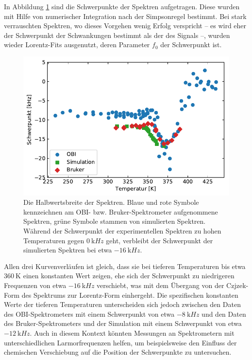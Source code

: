 \par\bigskip

In Abbildung \ref{fig:res:spek_mean} sind die Schwerpunkte der Spektren aufgetragen. Diese wurden mit Hilfe von numerischer Integration nach der Simpsonregel bestimmt. Bei stark verrauschten Spektren, wo dieses Vorgehen wenig Erfolg verspricht -- es wird eher der Schwerpunkt der Schwankungen bestimmt als der des Signals --, wurden wieder Lorentz-Fits ausgenutzt, deren Parameter $f_0$ der Schwerpunkt ist.
\begin{figure}
	\begin{center}
		\includegraphics[width=.9\textwidth]{graphics/plot/mean.pdf} 
	\end{center}
	\caption{Die Halbwertsbreite der Spektren. Blaue und rote Symbole kennzeichnen am OBI- bzw. Bruker-Spektrometer aufgenommene Spektren, grüne Symbole stammen von simulierten Spektren. Während der Schwerpunkt der experimentellen Spektren zu hohen Temperaturen gegen $\SI{0}{\kilo Hz}$ geht, verbleibt der Schwerpunkt der simulierten Spektren bei etwa $\SI{-16}{\kilo Hz}$.} \label{fig:res:spek_mean}
\end{figure}

Allen drei Kurvenverläufen ist gleich, dass sie bei tieferen Temperaturen bis etwa $\SI{360}{\kelvin}$ einen konstanten Wert zeigen, ehe sich der Schwerpunkt zu niedrigeren Frequenzen von etwa $\SI{-16}{\kilo Hz}$ verschiebt, was mit dem Übergang von der Czjzek-Form des Spektrums zur Lorentz-Form einhergeht. Die spezifischen konstanten Werte der tieferen Temperaturen unterscheiden sich jedoch zwischen den Daten des OBI-Spektrometers mit einem Schwerpunkt von etwa $\SI{-8}{\kilo Hz}$ und den Daten des Bruker-Spektrometers und der Simulation mit einem Schwerpunkt von etwa $\SI{-12}{\kilo Hz}$. Auch in diesem Kontext könnten Messungen an Spektrometern mit unterschiedlichen Larmorfrequenzen helfen, um beispielsweise den Einfluss der chemischen Verschiebung auf die Position der Schwerpunkte zu untersuchen.


